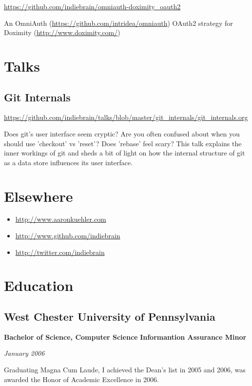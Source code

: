 \documentclass[12pt letterpaper notitlepage]{article}
\begin{document}
\url{https://github.com/indiebrain/omniauth-doximity_oauth2}

An OmniAuth (\url{https://github.com/intridea/omniauth}) OAuth2 strategy for
Doximity (\url{http://www.doximity.com/})

\section*{Talks}
\label{sec-5}

\subsection*{Git Internals}
\label{sec-5-1}

\url{https://github.com/indiebrain/talks/blob/master/git_internals/git_internals.org}

Does git's user interface seem cryptic? Are you often confused about when you
should use 'checkout' vs 'reset'? Does 'rebase' feel scary? This talk explains
the inner workings of git and sheds a bit of light on how the internal structure
of git as a data store influences its user interface.

\section*{Elsewhere}
\label{sec-6}

\begin{itemize}
\item \url{http://www.aaronkuehler.com}
\item \url{http://www.github.com/indiebrain}
\item \url{http://twitter.com/indiebrain}
\end{itemize}

\section*{Education}
\label{sec-7}

\subsection*{West Chester University of Pennsylvania}
\label{sec-7-1}

\textbf{Bachelor of Science, Computer Science}
\textbf{Informantion Assurance Minor}

\emph{January 2006}

Graduating Magna Cum Laude, I achieved the Dean's list in 2005 and 2006, was
awarded the Honor of Academic Excellence in 2006.
\end{document}
